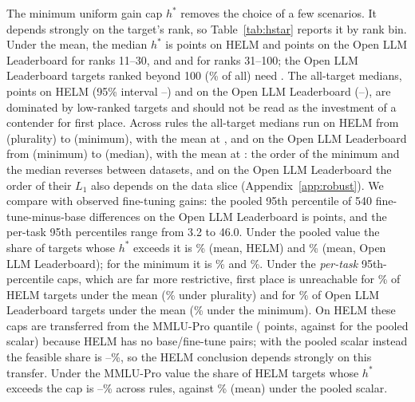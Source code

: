 The minimum uniform gain cap $h^\ast$ removes the choice of a few scenarios. It depends strongly on the target's rank, so Table~\ref{tab:hstar} reports it by rank bin. Under the mean, the median $h^\ast$ is \hstarBinHelmMeanElevenThirty{} points on HELM and \hstarBinOllbMeanElevenThirty{} points on the Open LLM Leaderboard for ranks 11--30, and \hstarBinHelmMeanThirtyOneHundred{} and \hstarBinOllbMeanThirtyOneHundred{} for ranks 31--100; the \hstarBinNOllbOverHundred{} Open LLM Leaderboard targets ranked beyond 100 (\ollbShareOverHundred\% of all) need \hstarBinOllbMeanOverHundred{}. The all-target medians, \hstarHelmMean{} points on HELM (95\% interval \hstarHelmMeanLo--\hstarHelmMeanHi) and \hstarOllbMean{} on the Open LLM Leaderboard (\hstarOllbMeanLo--\hstarOllbMeanHi), are dominated by low-ranked targets and should not be read as the investment of a contender for first place. Across rules the all-target medians run on HELM from \hstarHelmPlurality{} (plurality) to \hstarHelmMin{} (minimum), with the mean at \hstarHelmMean, and on the Open LLM Leaderboard from \hstarOllbMin{} (minimum) to \hstarOllbMedian{} (median), with the mean at \hstarOllbMean: the order of the minimum and the median reverses between datasets, and on the Open LLM Leaderboard the order of their $L_1$ also depends on the data slice (Appendix~\ref{app:robust}). We compare with observed fine-tuning gains: the pooled 95th percentile of 540 fine-tune-minus-base differences on the Open LLM Leaderboard is \empPooled{} points, and the per-task 95th percentiles range from 3.2 to 46.0. Under the pooled value the share of targets whose $h^\ast$ exceeds it is \hstarShareHelmMean\% (mean, HELM) and \hstarShareOllbMean\% (mean, Open LLM Leaderboard); for the minimum it is \hstarShareHelmMin\% and \hstarShareOllbMin\%. Under the \emph{per-task} 95th-percentile caps, which are far more restrictive, first place is unreachable for \ceightInfHelmMean\% of HELM targets under the mean (\ceightInfHelmPlurality\% under plurality) and for \ceightInfOllbMean\% of Open LLM Leaderboard targets under the mean (\ceightInfOllbMin\% under the minimum). On HELM these caps are transferred from the MMLU-Pro quantile (\empMmluQ{} points, against \empPooled{} for the pooled scalar) because HELM has no base/fine-tune pairs; with the pooled scalar instead the feasible share is \empPoolHelmMin--\empPoolHelmMax\%, so the HELM conclusion depends strongly on this transfer. Under the MMLU-Pro value the share of HELM targets whose $h^\ast$ exceeds the cap is \hstarMmluShareHelmPlurality--\hstarMmluShareHelmHarmonic\% across rules, against \hstarShareHelmMean\% (mean) under the pooled scalar.

